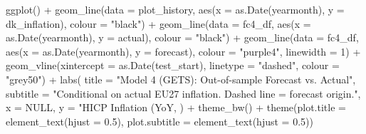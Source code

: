 ggplot() +
  geom_line(data = plot_history,
            aes(x = as.Date(yearmonth), y = dk_inflation), colour = "black") +
  geom_line(data = fc4_df,
            aes(x = as.Date(yearmonth), y = actual), colour = "black") +
  geom_line(data = fc4_df,
            aes(x = as.Date(yearmonth), y = forecast),
            colour = "purple4", linewidth = 1) +
  geom_vline(xintercept = as.Date(test_start),
             linetype = "dashed", colour = "grey50") +
  labs(
    title    = "Model 4 (GETS): Out-of-sample Forecast vs. Actual",
    subtitle = "Conditional on actual EU27 inflation. Dashed line = forecast origin.",
    x = NULL, y = "HICP Inflation (YoY, %
  ) +
  theme_bw() +
  theme(plot.title    = element_text(hjust = 0.5),
        plot.subtitle = element_text(hjust = 0.5))